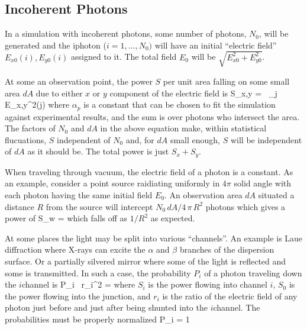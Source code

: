 \subsection{Incoherent Photons}

In a simulation with incoherent photons, some number of photons,
$N_0$, will be generated and the i\Th photon ($i = 1, \ldots, N_0)$
will have an initial ``electric field'' $E_{x0}(i), E_{y0}(i)$ assigned to
it. The total field $E_0$ will be $\sqrt{E_{x0}^2 + E_{y0}^2}$.

At some an observation point, the power $S$ per unit area falling on
some small area $dA$ due to either $x$ or $y$ component of the
electric field is
\Begineq
  S_{x,y} =  \, \sum_{j \in {}} E_{x,y}^2(j)
  \label{panda1}
\Endeq
where $\alpha_p$ is a constant that can be chosen to fit the
simulation against experimental results, and the sum is over photons
who intersect the area. The factors of $N_0$ and $dA$ in the above
equation make, within statistical flucuations, $S$ independent of
$N_0$ and, for $dA$ small enough, $S$ will be independent of $dA$ as
it should be. The total power is just $S_x + S_y$.

When traveling through vacuum, the electric field of a photon is a
constant.  As an example, consider a point source raidiating uniformly
in $4\pi$ solid angle with each photon having the same initial field
$E_0$. An observation area $dA$ situated a distance $R$ from the
source will intercept $N_0 \, dA / 4 \, \pi \, R^2$ photons which
gives a power of
\Begineq
  S_w = 
\Endeq
which falls off as $1/R^2$ as expected.

At some places the light may be split into various ``channels''. An
example is Laue diffraction where X-rays can excite the $\alpha$ and
$\beta$ branches of the dispersion surface. Or a partially silvered
mirror where some of the light is reflected and some is transmitted.
In such a case, the probability $P_i$ of a photon traveling down the
$i$\Th channel is
\Begineq
  P_i \, r_i^2 = 
  \label{rpss1}
\Endeq
where $S_i$ is the power flowing into channel $i$, $S_0$ is the power
flowing into the junction, and $r_i$ is the ratio of the electric
field of any photon just before and just after being shunted into the
$i$\Th channel. The probabilities must be properly normalized
\Begineq
  \sum P_i = 1
  \label{p1}
\Endeq

